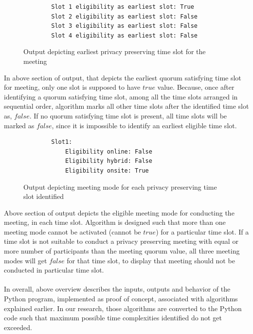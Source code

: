 \begin{figure}[H]  
    \centering
    \begin{verbatim}
        Slot 1 eligibility as earliest slot: True
        Slot 2 eligibility as earliest slot: False
        Slot 3 eligibility as earliest slot: False
        Slot 4 eligibility as earliest slot: False
    \end{verbatim}
    \caption{Output depicting earliest privacy preserving time slot for the meeting}
    \label{fig:output depicting earliest privacy preserving time slot for the meeting}
\end{figure} 
In above section of output, that depicts the earliest quorum satisfying time slot for meeting, only one slot is supposed to have $true$ value. Because, once after identifying a quorum satisfying time slot, among all the time slots arranged in sequential order, algorithm marks all other time slots after the identified time slot as, $false$. If no quorum satisfying time slot is present, all time slots will be marked as $false$, since it is impossible to identify an earliest eligible time slot.\\ 

\begin{figure}[H]  
    \centering
    \begin{verbatim}
        Slot1:
            Eligibility online: False
            Eligibility hybrid: False
            Eligibility onsite: True
    \end{verbatim}
    \caption{Output depicting meeting mode for each privacy preserving time slot identified}
    \label{fig:output depicting meeting mode for each privacy preserving time slot identified}
\end{figure} 
Above section of output depicts the eligible meeting mode for conducting the meeting, in each time slot. Algorithm is designed such that more than one meeting mode cannot be activated (cannot be $true$) for a particular time slot. If a time slot is not suitable to conduct a privacy preserving meeting with equal or more number of participants than the meeting quorum value, all three meeting modes will get $false$ for that time slot, to display that meeting should not be conducted in particular time slot.\\ \\
In overall, above overview describes the inputs, outputs and behavior of the Python program, implemented as proof of concept, associated with algorithms explained earlier. In our research, those algorithms are converted to the Python code such that maximum possible time complexities identified do not get exceeded.\\ \\

